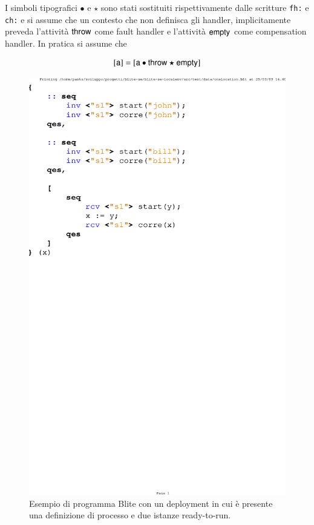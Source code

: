 I simboli tipografici $\bullet$ e $\star$ sono stati sostituiti rispettivamente
dalle scritture \verb#fh:# e \verb#ch:# e si assume che un contesto che non
definisca gli handler, implicitamente preveda l'attività ${\sf throw}$ come fault
handler e l'attività ${\sf empty}$ come compensation handler. In pratica si assume
che \label{defHandelr}

$$
{\sf [a]} = [{\sf a} \bullet {\sf throw} \star {\sf empty}]
$$

\begin{figure}[!t]
\begin{center}
  \includegraphics[scale=0.80,clip]{linguaggio/dia/blt2}
   \caption[Codice Blite, esempio ready to run instance]{Esempio di programma
   Blite con un deployment in cui è presente una definizione di processo e due
   istanze ready-to-run.}
  \label{fig:lin:blt2}
\end{center}
\end{figure}

